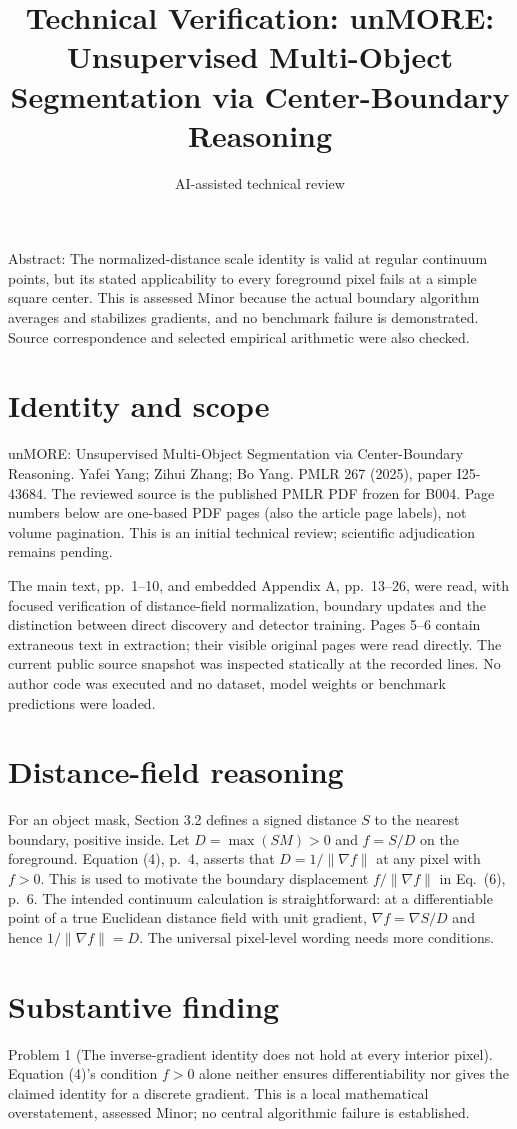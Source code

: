 \documentclass[10pt]{article}
\title{Technical Verification: unMORE: Unsupervised Multi-Object Segmentation via Center-Boundary Reasoning}
\author{AI-assisted technical review}
\date{}
\begin{document}
\maketitle
Abstract: The normalized-distance scale identity is valid at regular continuum points, but its stated applicability to every foreground pixel fails at a simple square center. This is assessed Minor because the actual boundary algorithm averages and stabilizes gradients, and no benchmark failure is demonstrated. Source correspondence and selected empirical arithmetic were also checked.\par
\section*{Identity and scope}
unMORE: Unsupervised Multi-Object Segmentation via Center-Boundary Reasoning. Yafei Yang; Zihui Zhang; Bo Yang. PMLR 267 (2025), paper I25-43684. The reviewed source is the published PMLR PDF frozen for B004. Page numbers below are one-based PDF pages (also the article page labels), not volume pagination. This is an initial technical review; scientific adjudication remains pending.\par
The main text, pp. 1–10, and embedded Appendix A, pp. 13–26, were read, with focused verification of distance-field normalization, boundary updates and the distinction between direct discovery and detector training. Pages 5–6 contain extraneous text in extraction; their visible original pages were read directly. The current public source snapshot was inspected statically at the recorded lines. No author code was executed and no dataset, model weights or benchmark predictions were loaded.\par
\section*{Distance-field reasoning}
For an object mask, Section 3.2 defines a signed distance \(S\) to the nearest boundary, positive inside. Let \(D=\max(SM)>0\) and \(f=S/D\) on the foreground. Equation (4), p. 4, asserts that \(D=1/\|\nabla f\|\) at any pixel with \(f>0\). This is used to motivate the boundary displacement \(f/\|\nabla f\|\) in Eq. (6), p. 6. The intended continuum calculation is straightforward: at a differentiable point of a true Euclidean distance field with unit gradient, \(\nabla f=\nabla S/D\) and hence \(1/\|\nabla f\|=D\). The universal pixel-level wording needs more conditions.\par
\section*{Substantive finding}
Problem 1 (The inverse-gradient identity does not hold at every interior pixel).  Equation (4)’s condition \(f>0\) alone neither ensures differentiability nor gives the claimed identity for a discrete gradient. This is a local mathematical overstatement, assessed Minor; no central algorithmic failure is established.\par
\end{document}
